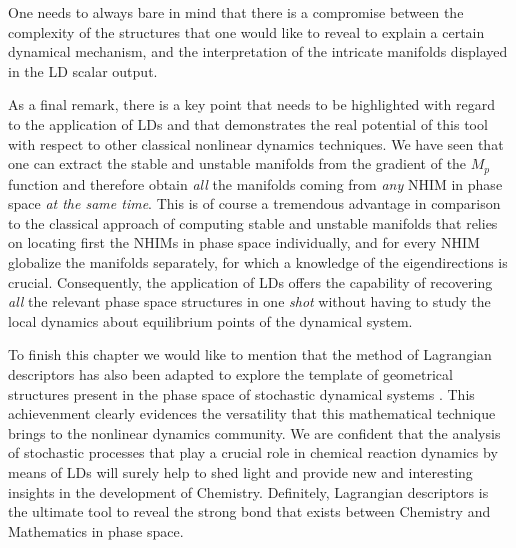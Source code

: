 \documentclass[8pt]{article}
\begin{document}
 One needs to always bare in mind that there is a compromise between the complexity of the structures that one would like to reveal to explain a certain dynamical mechanism, and the interpretation of the intricate manifolds displayed in the LD scalar output. 




As a final remark, there is a key point that needs to be highlighted with regard to the application of LDs and that demonstrates the real potential of this tool with respect to other classical nonlinear dynamics techniques. We have seen that one can extract the stable and unstable manifolds from the gradient of the $M_p$ function and therefore obtain \textit{all} the manifolds coming from \textit{any} NHIM in phase space \textit{at the same time}. This is of course a tremendous advantage in comparison to the classical approach of computing stable and unstable manifolds that relies on locating first the NHIMs in phase space individually, and for every NHIM globalize the manifolds separately, for which a knowledge of the eigendirections is crucial. Consequently, the application of LDs offers the capability of recovering \textit{all} the relevant phase space structures in one \textit{shot} without having to study the local dynamics about equilibrium points of the dynamical system.

\smallskip

To finish this chapter we would like to mention that the method of Lagrangian descriptors has also been adapted to explore the template of geometrical structures present in the phase space of stochastic dynamical systems \cite{balibrea2016lagrangian}. This achievenment clearly evidences the versatility that this mathematical technique brings to the nonlinear dynamics community. We are confident that the analysis of stochastic processes that play a crucial role in chemical reaction dynamics by means of LDs will surely help to shed light and provide new and interesting insights in the development of Chemistry. Definitely, Lagrangian descriptors is the ultimate tool to reveal the strong bond that exists between Chemistry and Mathematics in phase space.






\end{document}
